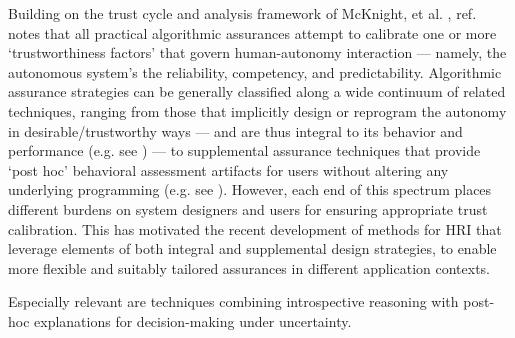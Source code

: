 Building on the trust cycle and analysis framework of McKnight, et al. \nisar{[cite]}, ref. \cite{Israelsen2018-qz} notes that all practical algorithmic assurances attempt to calibrate one or more `trustworthiness factors' that govern human-autonomy interaction --- namely, the autonomous system's the reliability, competency, and predictability. Algorithmic assurance strategies can be generally classified along a wide continuum of related techniques, ranging from those that implicitly design or reprogram the autonomy in desirable/trustworthy ways --- and are thus integral to its behavior and performance (e.g. see ) --- to supplemental assurance techniques that provide `post hoc' behavioral assessment artifacts for users without altering any underlying programming (e.g. see ). However, each end of this spectrum places different burdens on system designers and users for ensuring appropriate trust calibration. This has motivated the recent development of methods for HRI that leverage elements of both integral and supplemental design strategies, to enable more flexible and suitably tailored assurances in different application contexts. 

Especially relevant are techniques combining introspective reasoning with post-hoc explanations for decision-making under uncertainty. 


